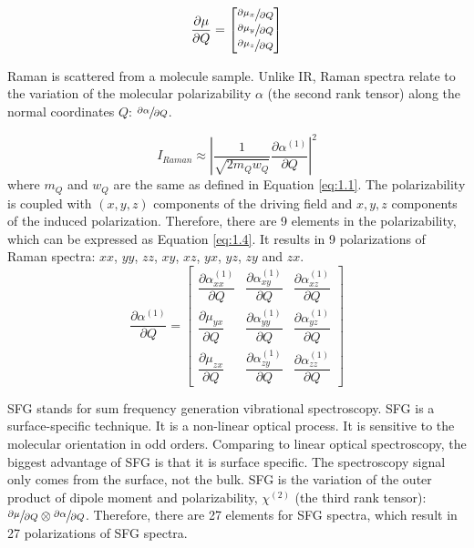 \begin{equation} \label{eq:1.2}
\frac{\partial\mu}{\partial Q} = \begin{bmatrix}
									\sfrac{\partial\mu_{x}}{\partial Q} \\
									\sfrac{\partial\mu_{y}}{\partial Q} \\
									\sfrac{\partial\mu_{z}}{\partial Q}
								  \end{bmatrix}
\end{equation}

Raman is scattered from a molecule sample. Unlike IR, Raman spectra relate to the variation of the molecular polarizability $\alpha$ (the second rank tensor) along the normal coordinates $Q$: $\sfrac{\partial\alpha}{\partial Q}$. 

\begin{equation} \label{eq:1.3}
I_{Raman} \approx \left| \frac{1}{\sqrt{2m_{Q}w_{Q}}} \frac{\partial\alpha^{(1)}}{\partial Q} \right|^{2}
\end{equation}
where $m_{Q}$ and $w_{Q}$ are the same as defined in Equation \ref{eq:1.1}. The polarizability is coupled with $(x, y, z)$ components of the driving field and $x, y, z$ components of the induced polarization. Therefore, there are 9 elements in the polarizability, which can be expressed as Equation \ref{eq:1.4}. It results in 9 polarizations of Raman spectra: $xx$, $yy$, $zz$, $xy$, $xz$, $yx$, $yz$, $zy$ and $zx$. \\

\begin{equation} \label{eq:1.4}
\frac{\partial\alpha^{(1)}}{\partial Q} = \begin{bmatrix}
\dfrac{\partial\alpha_{xx}^{(1)}}{\partial Q} & \dfrac{\partial\alpha_{xy}^{(1)}}{\partial Q} & \dfrac{\partial\alpha_{xz}^{(1)}}{\partial Q} \\
\dfrac{\partial\mu_{yx}}{\partial Q} & \dfrac{\partial\alpha_{yy}^{(1)}}{\partial Q} & \dfrac{\partial\alpha_{yz}^{(1)}}{\partial Q}\\
\dfrac{\partial\mu_{zx}}{\partial Q} & \dfrac{\partial\alpha_{zy}^{(1)}}{\partial Q} & \dfrac{\partial\alpha_{zz}^{(1)}}{\partial Q}
\end{bmatrix}
\end{equation}

SFG stands for sum frequency generation vibrational spectroscopy. SFG is a surface-specific technique. It is a non-linear optical process. It is sensitive to the molecular orientation in odd orders. Comparing to linear optical spectroscopy, the biggest advantage of SFG is that it is surface specific. The spectroscopy signal only comes from the surface, not the bulk. SFG is the variation of the outer product of dipole moment and polarizability, $\chi^{(2)}$ (the third rank tensor): $\sfrac{\partial\mu}{\partial Q} \otimes \sfrac{\partial\alpha}{\partial Q} $. Therefore, there are 27 elements for SFG spectra, which result in 27 polarizations of SFG spectra. \\

